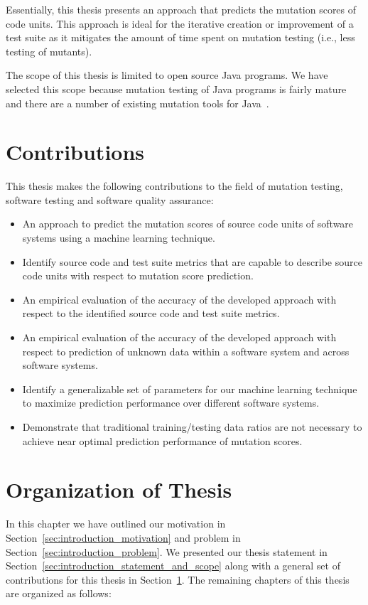 Essentially, this thesis presents an approach that predicts the mutation scores of code units. This approach is ideal for the iterative creation or improvement of a test suite as it mitigates the amount of time spent on mutation testing (i.e., less testing of mutants).

The scope of this thesis is limited to open source Java programs. We have selected this scope because mutation testing of Java programs is fairly mature and there are a number of existing mutation tools for Java~\cite{JH10}.


\section{Contributions}
\label{sec:introduction_contributions}
This thesis makes the following contributions to the field of mutation testing, software testing and software quality assurance:

\begin{itemize}
  \item An approach to predict the mutation scores of source code units of software systems using a machine learning technique.
  \item Identify source code and test suite metrics that are capable to describe source code units with respect to mutation score prediction.
  \item An empirical evaluation of the accuracy of the developed approach with respect to the identified source code and test suite metrics.
  \item An empirical evaluation of the accuracy of the developed approach with respect to prediction of unknown data within a software system and across software systems.
  \item Identify a generalizable set of parameters for our machine learning technique to maximize prediction performance over different software systems.
  \item Demonstrate that traditional training/testing data ratios are not necessary to achieve near optimal prediction performance of mutation scores.
\end{itemize}


\section{Organization of Thesis}
\label{sec:introduction_organization}
In this chapter we have outlined our motivation in Section~\ref{sec:introduction_motivation} and problem in Section~\ref{sec:introduction_problem}. We presented our thesis statement in Section~\ref{sec:introduction_statement_and_scope} along with a general set of contributions for this thesis in Section~\ref{sec:introduction_contributions}. The remaining chapters of this thesis are organized as follows:

